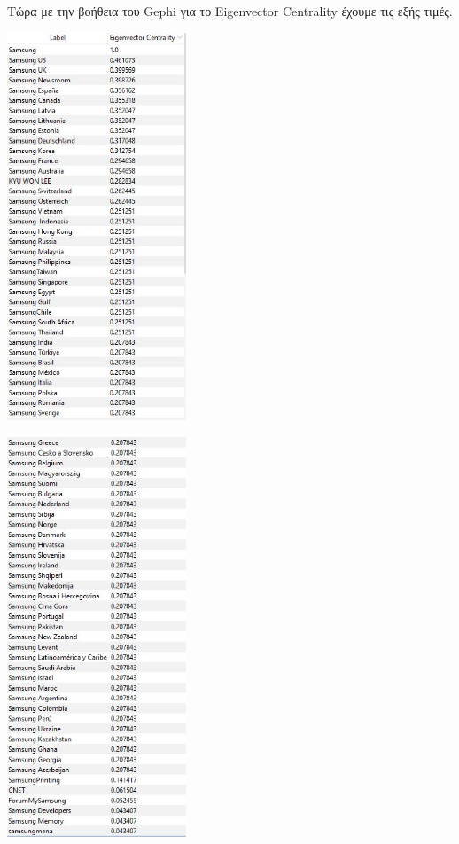 \documentclass[12pt]{article}
\begin{document}
	\vspace{12pt}
	Τώρα με την βοήθεια του Gephi για το Eigenvector Centrality έχουμε τις εξής τιμές.
	\begin{center}
		\begin{adjustbox}{valign=t}
			\includegraphics[width=0.4\textwidth]{photos-files/section7/eigenvector_centrality1.JPG}
		\end{adjustbox}
		\hfill
		\begin{adjustbox}{valign=t}
			\includegraphics[width=0.4\textwidth]{photos-files/section7/eigenvector_centrality2.JPG}
		\end{adjustbox}
	\end{center}
	
\end{document}
